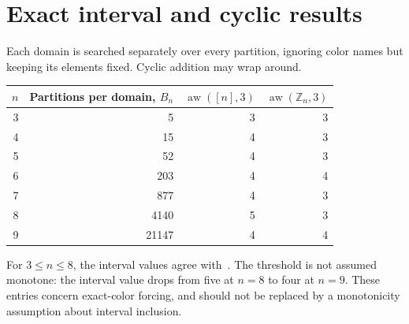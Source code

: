 \documentclass[10pt,letterpaper]{article}
\newcommand{\aw}{\operatorname{aw}}
\begin{document}
\section{Exact interval and cyclic results}
Each domain is searched separately over every partition, ignoring color names
but keeping its elements fixed. Cyclic addition may wrap around.
\begin{center}
\begin{tabular}{rrrr}
\toprule
$n$ & Partitions per domain, $B_n$ & $\aw([n],3)$ & $\aw(\mathbb Z_n,3)$\\
\midrule
3 & 5 & 3 & 3\\
4 & 15 & 4 & 3\\
5 & 52 & 4 & 3\\
6 & 203 & 4 & 4\\
7 & 877 & 4 & 3\\
8 & 4140 & 5 & 3\\
9 & 21147 & 4 & 4\\
\bottomrule
\end{tabular}
\end{center}
For $3\le n\le8$, the interval values agree with~\cite[Theorem 1.1]{BE}.
The threshold is not assumed monotone: the interval value drops from five
at $n=8$ to four at $n=9$. These entries concern exact-color forcing, and
should not be replaced by a monotonicity assumption about interval inclusion.
\end{document}
